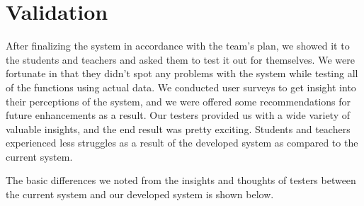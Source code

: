 \section{Validation} \label{sec:val}
After finalizing the system in accordance with the team's plan, we showed it to the students and teachers and asked them to test it out for themselves. We were fortunate in that they didn't spot any problems with the system while testing all of the functions using actual data. We conducted user surveys to get insight into their perceptions of the system, and we were offered some recommendations for future enhancements as a result. Our testers provided us with a wide variety of valuable insights, and the end result was pretty exciting. Students and teachers experienced less struggles as a result of the developed system as compared to the current system.

The basic differences we noted from the insights and thoughts of testers between the current system and our developed system is shown below.

